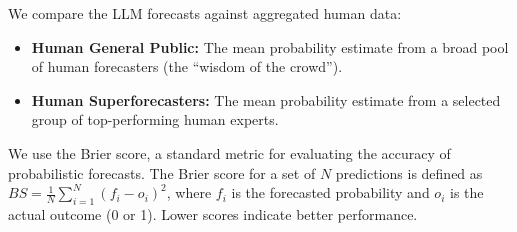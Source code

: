  We compare the LLM forecasts against aggregated human data:
\begin{itemize}[leftmargin=*,itemsep=0pt,topsep=0pt]
    \item {\bf Human General Public:} The mean probability estimate from a broad pool of human forecasters (the ``wisdom of the crowd'').
    \item {\bf Human Superforecasters:} The mean probability estimate from a selected group of top-performing human experts.
\end{itemize}

 We use the Brier score, a standard metric for evaluating the accuracy of probabilistic forecasts. The Brier score for a set of $N$ predictions is defined as $BS = \frac{1}{N} \sum_{i=1}^N (f_i - o_i)^2$, where $f_i$ is the forecasted probability and $o_i$ is the actual outcome (0 or 1). Lower scores indicate better performance.
